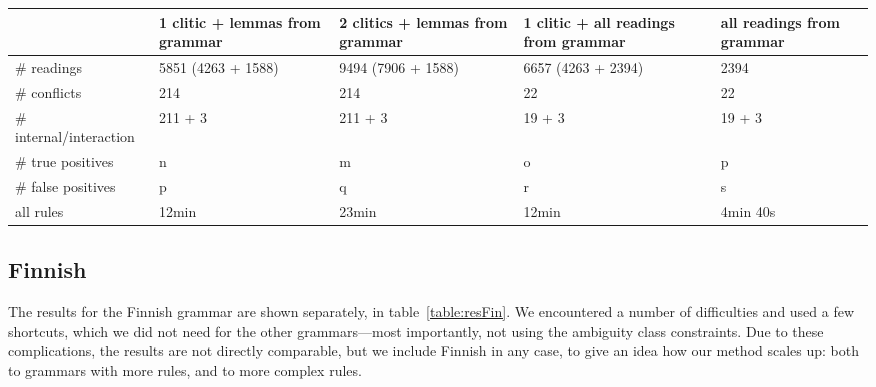 

\begin{table*}[t!]
\centering
\begin{tabular}{|p{2.5cm}|p{3cm}|p{3cm}|p{3cm}|p{3cm}|}

\hline
              & 1 clitic + 
                lemmas from 
                 grammar & 2 clitics 
                           + lemmas from 
                              grammar & 1 clitic +
                                          all readings 
                                          from grammar    & all readings from grammar \\ \hline
\# readings   & 5851 (4263 
                 + 1588) & 9494
                       (7906 + 1588) & 6657 (4263 + 2394) & 2394  \\ \hline
\# conflicts  & 214      & 214       & 22                & 22  \\ \hline
\# internal/interaction & 211 + 3    & 211 + 3           & 19 + 3    & 19 + 3  \\ \hline

\# true 
   positives  & n        & m         & o                & p  \\ \hline
\# false 
   positives  & p        & q         & r                & s   \\ \hline
\clock{}all 
       rules & 12min     & 23min     & 12min &  4min 40s \\ \hline


\end{tabular}
\caption{Results for Finnish (1185 rules).}
\label{table:resFin}
\end{table*}

\subsection{Finnish} 

The results for the Finnish grammar are shown separately, in table~\ref{table:resFin}. We encountered a number of difficulties and used a few shortcuts, which we did not need for the other grammars---most importantly, not using the ambiguity class constraints. Due to these complications, the results are not directly comparable, but we include Finnish in any case, 
to give an idea how our method scales up: both to grammars with more rules, and to more complex rules.

